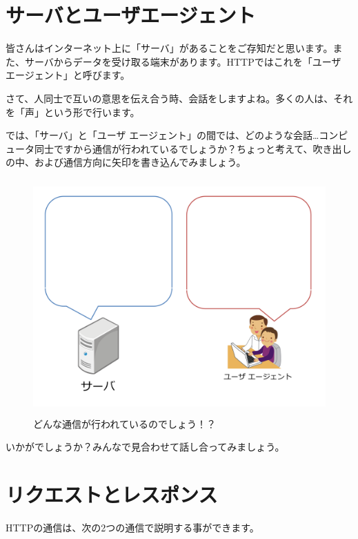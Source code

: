 \documentclass[a4j,11pt,openany]{jsbook}
\begin{document}
\section{サーバとユーザエージェント}

皆さんはインターネット上に「サーバ」があることをご存知だと思います。また、サーバからデータを受け取る端末があります。HTTPではこれを「ユーザ エージェント」と呼びます。

さて、人同士で互いの意思を伝え合う時、会話をしますよね。多くの人は、それを「声」という形で行います。

では、「サーバ」と「ユーザ エージェント」の間では、どのような会話…コンピュータ同士ですから通信が行われているでしょうか？ちょっと考えて、吹き出しの中、および通信方向に矢印を書き込んでみましょう。


\begin{figure}[H]
    \begin{center}
        \includegraphics[height=9cm]{./req_res_1.png}
        \caption{どんな通信が行われているのでしょう！？}
        \label{req_res_1}
    \end{center}
\end{figure}

いかがでしょうか？みんなで見合わせて話し合ってみましょう。

\section{リクエストとレスポンス}

HTTPの通信は、次の2つの通信で説明する事ができます。
\end{document}
